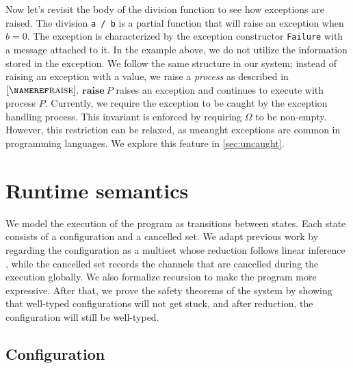 \documentclass[12pt, openany]{memoir}
\newcommand*{\craise}[1]{\textbf{raise}\ #1}
\begin{document}
Now let's revisit the body of the division function to see how exceptions are raised. 
The division \texttt{a / b} is a partial function that will raise an exception when $b = 0$. 
The exception is characterized by the exception constructor \texttt{Failure} with a message attached to it. 
In the example above, we do not utilize the information stored in the exception.
We follow the same structure in our system; instead of raising an exception with a value, 
we raise a \textit{process} as described in $\ruleref{raise}$. $\craise{P}$ raises an exception and continues to execute with process $P$. 
Currently, we require the exception to be caught by the exception handling process. This invariant is enforced by requiring $\Omega$ to be non-empty. 
However, this restriction can be relaxed, as uncaught exceptions are common in programming languages. We explore this feature in \cref{sec:uncaught}.

\chapter{Runtime semantics}
We model the execution of the program as transitions between states. 
Each state consists of a configuration and a cancelled set. 
We adapt previous work by regarding the configuration as a multiset whose reduction follows linear inference \cite{Cervesato2009}, 
while the cancelled set records the channels that are cancelled during the execution globally. 
We also formalize recursion to make the program more expressive. 
After that, we prove the safety theorems of the system by showing that well-typed configurations will not get stuck, 
and after reduction, the configuration will still be well-typed.
\section{Configuration}
\end{document}
